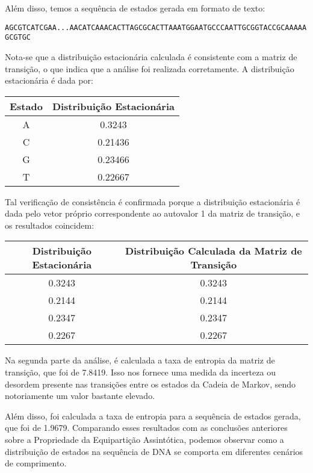 \documentclass{article}
\begin{document}
    Além disso, temos a sequência de estados gerada em formato de texto:
    
    \texttt{AGCGTCATCGAA...AACATCAAACACTTAGCGCACTTAAATGGAATGCCCAATTGCGGTACCGCAAAAAGCGTGC}
    
    Nota-se que a distribuição estacionária calculada é consistente com a matriz de transição, o que indica que a análise foi realizada corretamente. A distribuição estacionária é dada por:
    
    \begin{center}
    \begin{tabular}{|c|c|}
    \hline
    Estado & Distribuição Estacionária \\
    \hline
    A & 0.3243 \\
    C & 0.21436 \\
    G & 0.23466 \\
    T & 0.22667 \\
    \hline
    \end{tabular}
    \end{center}
    
    Tal verificação de consistência é confirmada porque a distribuição estacionária é dada pelo vetor próprio correspondente ao autovalor 1 da matriz de transição, e os resultados coincidem:
    
    \begin{center}
    \begin{tabular}{|c|c|}
    \hline
    Distribuição Estacionária & Distribuição Calculada da Matriz de Transição \\
    \hline
    0.3243 & 0.3243 \\
    0.2144 & 0.2144 \\
    0.2347 & 0.2347 \\
    0.2267 & 0.2267 \\
    \hline
    \end{tabular}
    \end{center}

    Na segunda parte da análise, é calculada a taxa de entropia da matriz de transição, que foi de 7.8419. Isso nos fornece uma medida da incerteza ou desordem presente nas transições entre os estados da Cadeia de Markov, sendo notoriamente um valor bastante elevado.

    Além disso, foi calculada a taxa de entropia para a sequência de estados gerada, que foi de 1.9679. Comparando esses resultados com as conclusões anteriores sobre a Propriedade da Equipartição Assintótica, podemos observar como a distribuição de estados na sequência de DNA se comporta em diferentes cenários de comprimento.
\end{document}
